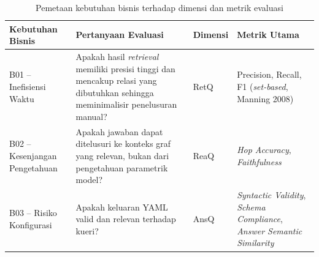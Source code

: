 \renewcommand{\arraystretch}{1.1}
\captionsetup[table]{justification=raggedright,singlelinecheck=false}
\begin{table}[htbp]
\caption{Pemetaan kebutuhan bisnis terhadap dimensi dan metrik evaluasi}
\label{tbl:mapping_bisnis_evaluasi}
\centering
\begin{tabular}{| p{} | p{} | p{} | p{} |}
\hline
\textbf{Kebutuhan Bisnis} & \textbf{Pertanyaan Evaluasi} & \textbf{Dimensi} & \textbf{Metrik Utama} \\
\hline
B01 -- Inefisiensi Waktu & Apakah hasil \textit{retrieval} memiliki presisi tinggi dan mencakup relasi yang dibutuhkan sehingga meminimalisir penelusuran manual? & RetQ & Precision, Recall, F1 (\textit{set-based}, Manning 2008) \\
\hline
B02 -- Kesenjangan Pengetahuan & Apakah jawaban dapat ditelusuri ke konteks graf yang relevan, bukan dari pengetahuan parametrik model? & ReaQ & \textit{Hop Accuracy}, \textit{Faithfulness} \\
\hline
B03 -- Risiko Konfigurasi & Apakah keluaran YAML valid dan relevan terhadap kueri? & AnsQ & \textit{Syntactic Validity}, \textit{Schema Compliance}, \textit{Answer Semantic Similarity} \\
\hline
\end{tabular}
\end{table}
